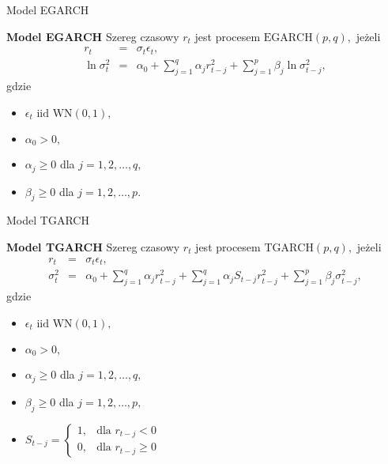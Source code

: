 \documentclass[a4paper, 11pt]{beamer}
\begin{document}
	\begin{frame}{Model EGARCH}
		\begin{block}{\textbf{Model EGARCH}}
			Szereg czasowy $r_t$ jest procesem $\mbox{EGARCH}\left(p,q\right),$ jeżeli \begin{eqnarray*}
				r_t & = & \sigma_t \epsilon_t,\\
				\ln\sigma^2_t & = & \alpha_0 + \sum_{j=1}^{q} \alpha_j r_{t-j}^2 + \sum_{j=1}^{p} \beta_j \ln\sigma_{t-j}^2,
			\end{eqnarray*} gdzie
			\begin{itemize}
				\item $\epsilon_t \mbox{ iid } \mbox{WN}\left(0, 1\right),$
				\item $\alpha_0 > 0,$
				\item $\alpha_j \geq 0$ dla $j=1,2,\ldots,q,$
				\item $\beta_j \geq 0$ dla $j=1,2,\ldots,p.$
			\end{itemize}
		\end{block}
	\end{frame}
	
	\begin{frame}{Model TGARCH}
		\begin{block}{\textbf{Model TGARCH}}
			Szereg czasowy $r_t$ jest procesem $\mbox{TGARCH}\left(p,q\right),$ jeżeli \begin{eqnarray*}
				r_t & = & \sigma_t \epsilon_t,\\
				\sigma^2_t & = & \alpha_0 + \sum_{j=1}^{q} \alpha_j r_{t-j}^2 + \sum_{j=1}^{q} \alpha_j S_{t-j}r_{t-j}^2 + \sum_{j=1}^{p} \beta_j \sigma_{t-j}^2,
			\end{eqnarray*} gdzie
			\begin{itemize}
				\item $\epsilon_t \mbox{ iid } \mbox{WN}\left(0, 1\right),$
				\item $\alpha_0 > 0,$
				\item $\alpha_j \geq 0$ dla $j=1,2,\ldots,q,$
				\item $\beta_j \geq 0$ dla $j=1,2,\ldots,p,$
				\item $S_{t-j} = 
					\begin{cases}
						1, & \mbox{dla } r_{t-j} < 0\\
						0, & \mbox{dla } r_{t-j} \geq 0
					\end{cases}$
			\end{itemize}
		\end{block}
	\end{frame}
	
\end{document}
